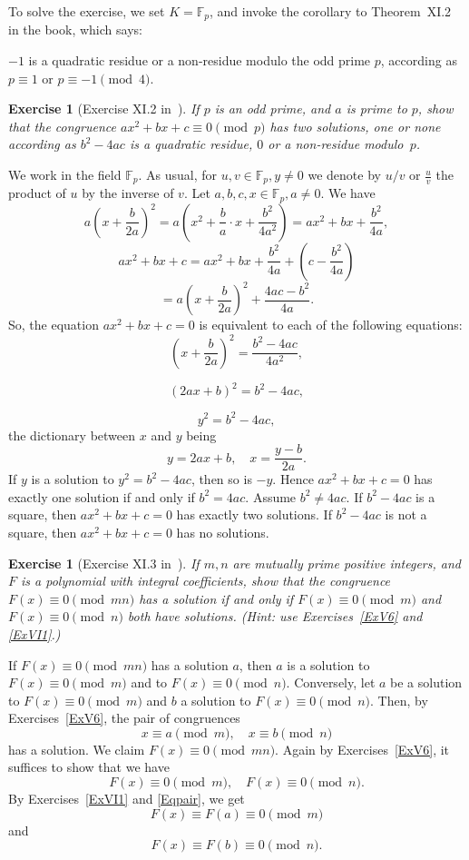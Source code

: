 \documentclass[12pt,letterpaper]{article}
\newcommand{\F}{\mathbb{F}}
\newtheorem{exer}[thm]{Exercise}
\theoremstyle{definition}
\begin{document}
To solve the exercise, we set $K=\F_p$, and invoke the corollary to Theorem~XI.2 in the book, which says: 

$-1$ is a quadratic residue or a non-residue modulo the odd prime $p$, according as $p\equiv1$ or $p\equiv-1 \pmod{4}$. 

\begin{exer}[Exercise XI.2 in~\cite{weil1979}]
If $p$ is an odd prime, and $a$ is prime to $p$, show that the congruence $ax^2+bx+c\equiv 0\pmod p$ has two solutions, one or none according as $b^2-4ac$ is a quadratic residue, $0$ or a non-residue modulo~$p$.
\end{exer}

We work in the field $\F_p$. As usual, for $u,v\in\F_p,y\ne0$ we denote by $u/v$ or $\frac{u}{v}$ the product of $u$ by the inverse of $v$. Let $a,b,c,x\in\F_p,a\ne0$. We have
$$
a\left(x+\frac{b}{2a}\right)^2=a\left(x^2+\frac{b}{a}\cdot x+\frac{b^2}{4a^2}\right)=ax^2+bx+\frac{b^2}{4a},
$$ 
$$
ax^2+bx+c=ax^2+bx+\frac{b^2}{4a}+\left(c-\frac{b^2}{4a}\right)
$$ 
$$
=a\left(x+\frac{b}{2a}\right)^2+\frac{4ac-b^2}{4a}.
$$ 
So, the equation $ax^2+bx+c=0$ is equivalent to each of the following equations: 
$$
\left(x+\frac{b}{2a}\right)^2=\frac{b^2-4ac}{4a^2},
$$ 

$$
(2ax+b)^2=b^2-4ac,
$$ 

$$
y^2=b^2-4ac,
$$ 
the dictionary between $x$ and $y$ being 
$$
y=2ax+b,\quad x=\frac{y-b}{2a}.
$$ 
If $y$ is a solution to $y^2=b^2-4ac$, then so is $-y$. Hence $ax^2+bx+c=0$ has exactly one solution if and only if $b^2=4ac$. Assume $b^2\ne 4ac$. If $b^2-4ac$ is a square, then $ax^2+bx+c=0$ has exactly two solutions. If $b^2-4ac$ is not a square, then $ax^2+bx+c=0$ has no solutions. 

\begin{exer}[Exercise XI.3 in~\cite{weil1979}]\label{ExXI3}
If $m,n$ are mutually prime positive integers, and $F$ is a polynomial with integral coefficients, show that the congruence $F(x)\equiv 0\pmod{mn}$ has a solution if and only if $F(x)\equiv 0\pmod m$ and $F(x)\equiv 0\pmod n$ both have solutions. (Hint: use Exercises~\ref{ExV6} and \ref{ExVI1}.) 
\end{exer}

If $F(x)\equiv 0\pmod{mn}$ has a solution $a$, then $a$ is a solution to $F(x)\equiv 0\pmod m$ and to $F(x)\equiv 0\pmod n$. Conversely, let $a$ be a solution to $F(x)\equiv 0\pmod m$ and $b$ a solution to $F(x)\equiv 0\pmod n$. Then, by Exercises~\ref{ExV6}, the pair of congruences 
\begin{equation}\label{Eqpair}
x \equiv a \pmod{m},\quad x \equiv b \pmod{n}
\end{equation} 
has a solution. We claim $F(x)\equiv 0\pmod{mn}$. Again by Exercises~\ref{ExV6}, it suffices to show that we have 
$$
F(x)\equiv 0\pmod m,\quad F(x)\equiv 0\pmod n.
$$ 
By Exercises~\ref{ExVI1} and \eqref{Eqpair}, we get 
$$
F(x) \equiv F(a) \equiv 0 \pmod m
$$ 
and 
$$
F(x) \equiv F(b) \equiv 0 \pmod n.
$$ 
\end{document}
